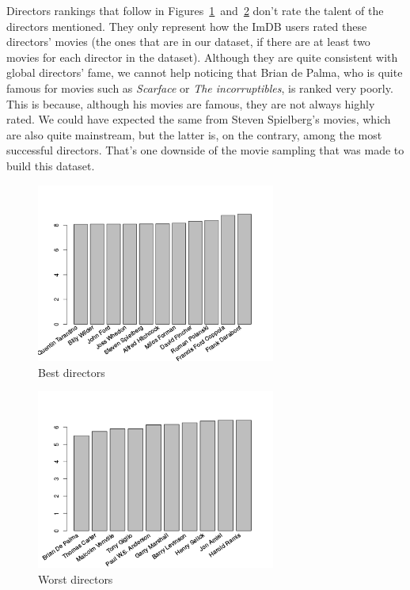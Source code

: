 Directors rankings that follow in Figures~\ref{fig:bestDirectors}~and~\ref{fig:worstDirectors} don't rate the talent of the directors mentioned.
They only represent how the ImDB users rated these directors' movies (the ones that are in our dataset, if there are at least two movies for each director in the dataset).
Although they are quite consistent with global directors' fame, we cannot help noticing that Brian de Palma, who is quite famous for movies such as \textit{Scarface} or \textit{The incorruptibles}, is ranked very poorly.
This is because, although his movies are famous, they are not always highly rated.
We could have expected the same from Steven Spielberg's movies, which are also quite mainstream, but the latter is, on the contrary, among the most successful directors.
That's one downside of the movie sampling that was made to build this dataset.

\begin{figure}[!h]
\begin{center}
\includegraphics[width=0.70\textwidth]{../src/pre-processing/stats/results/bestDirectors.png}
\end{center}
\caption{Best directors}
\label{fig:bestDirectors}
\end{figure}

\begin{figure}[!h]
\begin{center}
\includegraphics[width=0.70\textwidth]{../src/pre-processing/stats/results/worstDirectors.png}
\end{center}
\caption{Worst directors}
\label{fig:worstDirectors}
\end{figure}

